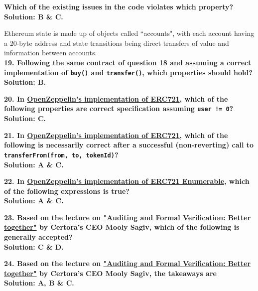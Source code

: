 \textbf{Which of the existing issues in the code violates which property?}\label{sec:raceXcertora_q18}\\

\textbf{Solution: B \& C.}

Ethereum state is made up of objects called ``accounts", with each account having a 20-byte address and state transitions being direct transfers of value and information between accounts.\\

\textbf{19. Following the same contract of question 18 and assuming a correct implementation of \texttt{buy()} and \texttt{transfer()}, which properties should hold?}\label{sec:raceXcertora_q19}\\

\textbf{Solution: B.}

\textbf{20. In \href{https://github.com/OpenZeppelin/openzeppelin-contracts/blob/master/contracts/token/ERC721/ERC721.sol}{OpenZeppelin’s implementation of ERC721}, which of the following properties are correct specification assuming \texttt{user != 0}?}\label{sec:raceXcertora_q20}\\

\textbf{Solution: C.}

\textbf{21. In \href{https://github.com/OpenZeppelin/openzeppelin-contracts/blob/master/contracts/token/ERC721/ERC721.sol}{OpenZeppelin’s implementation of ERC721}, which of the following is necessarily correct after a successful (non-reverting) call to \texttt{transferFrom(from, to, tokenId)}?}\label{sec:raceXcertora_q21}\\

\textbf{Solution: A \& C.}

\pagebreak

\textbf{22. In \href{https://github.com/OpenZeppelin/openzeppelin-contracts/blob/master/contracts/token/ERC721/extensions/ERC721Enumerable.sol}{OpenZeppelin’s implementation of ERC721 Enumerable}, which of the following expressions is true?}\label{sec:raceXcertora_q22}\\

\textbf{Solution: A \& C.}

\textbf{23. Based on the lecture on \href{https://www.youtube.com/watch?v=VGSsPIsbb6U}{"Auditing and Formal Verification: Better together"} by Certora's CEO Mooly Sagiv, which of the following is generally accepted?}\label{sec:raceXcertora_q23}\\

\textbf{Solution: C \& D.}

\textbf{24. Based on the lecture on \href{https://www.youtube.com/watch?v=VGSsPIsbb6U}{"Auditing and Formal Verification: Better together"} by Certora's CEO Mooly Sagiv, the takeaways are}\label{sec:raceXcertora_q24}\\

\textbf{Solution: A, B \& C.}